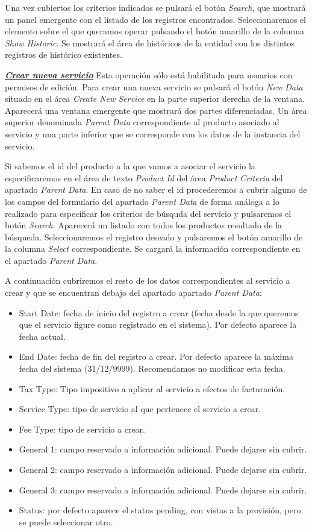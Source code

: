 Una vez cubiertos los criterios indicados se pulsará el botón \emph{Search}, que mostrará un panel emergente con el listado de los registros encontrados. Seleccionaremos el elemento sobre el que queramos operar pulsando el botón amarillo de la columna \emph{Show Historic}. Se mostrará el área de históricos de la entidad con los distintos registros de histórico existentes.


\underline{\textsl{\textbf{Crear nueva servicio}}}\newline
Esta operación sólo está habilitada para usuarios con permisos de edición.
Para crear una nueva servicio se pulsará el botón \textit{New Data} situado en el área \emph{Create New Service} en la parte superior derecha de la ventana. Aparecerá una ventana emergente que mostrará dos partes diferenciadas. Un área superior denominada \emph{Parent Data} correspondiente al producto asociado al servicio y una parte inferior que se corresponde con los datos de la instancia del servicio.

Si sabemos el id del producto a la que vamos a asociar el servicio la especificaremos en el área de texto \emph{Product Id} del área \emph{Product Criteria} del apartado \emph{Parent Data}. En caso de no saber el id procederemos a cubrir alguno de los campos del formulario del apartado \emph{Parent Data} de forma análoga a lo realizado para especificar los criterios de búsquda del servicio y pulsaremos el botón \emph{Search}. Aparecerá un listado con todos los productos resultado de la búsqueda. Seleccionaremos el registro deseado y pulsaremos el botón amarillo de la columna \emph{Select} correspondiente. Se cargará la información correspondiente en el apartado \emph{Parent Data}.

A continuación cubriremos el resto de los datos correspondientes al servicio a crear y que se encuentran debajo del apartado apartado \emph{Parent Data}:
\begin{itemize}
	\item Start Date: fecha de inicio del registro a crear (fecha desde la que queremos que el servicio figure como registrado en el sistema). Por defecto aparece la fecha actual.
	\item End Date: fecha de fin del registro a crear. Por defecto aparece la máxima fecha del sistema (31/12/9999). Recomendamos no modificar esta fecha.
	\item Tax Type: Tipo impositivo a aplicar al servicio a efectos de facturación.
	\item Service Type: tipo de servicio al que pertenece el servicio a crear.	
		\item Fee Type: tipo de servicio a crear. 
	\item General 1: campo reservado a información adicional. Puede dejarse sin cubrir.
	\item General 2: campo reservado a información adicional. Puede dejarse sin cubrir.
	\item General 3: campo reservado a información adicional. Puede dejarse sin cubrir.
	\item Status: por defecto aparece el status pending, con vistas a la provisión, pero se puede seleccionar otro.
\end{itemize}


